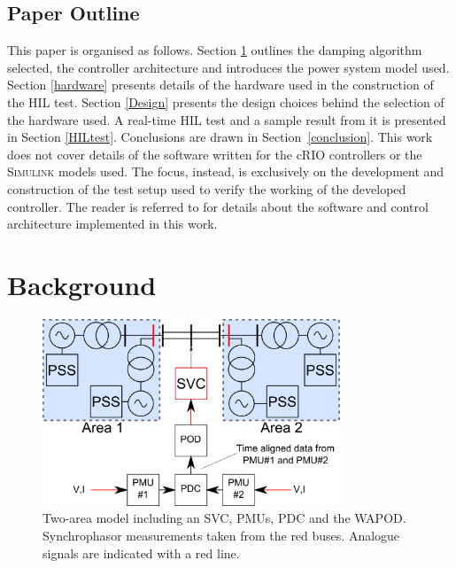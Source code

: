 \documentclass[a4paper, 10 pt, conference]{IEEEtran}
\begin{document}
\subsection{Paper Outline}
This paper is organised as follows. Section \ref{background} outlines the damping algorithm selected, the controller architecture and introduces the power system model used. Section \ref{hardware} presents details of the hardware used in the construction of the HIL test. Section \ref{Design} presents the design choices behind the selection of the hardware used. A real-time HIL test and a sample result from it is presented in Section \ref{HILtest}. Conclusions are drawn in Section~\ref{conclusion}. This work does not cover details of the software written for the cRIO controllers or the \textsc{Simulink} models used. The focus, instead, is exclusively on the development and construction of the test setup used to verify the working of the developed controller. The reader is referred to \cite{Rebello} for details about the software and control architecture implemented in this work.

\section{Background}\label{background}

\begin{figure}[!h]
\centering
\includegraphics[width=3.5in]{TwoArea.pdf} 
\caption{Two-area model including an SVC, PMUs, PDC and the WAPOD. Synchrophasor measurements taken from the red buses. Analogue signals are indicated with a red line.}
\label{TwoArea}
\end{figure}
\end{document}
